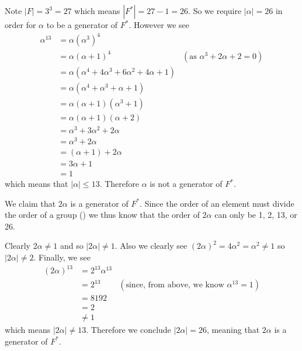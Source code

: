 \begin{questions}
\begin{partquestions}{\roman*}
        \item Note $|F| = 3^3 = 27$ which means $|F^\ast| = 27 - 1 = 26$. So we require $|\alpha| = 26$ in order for $\alpha$ to be a generator of $F^\ast$. However we see
        \begin{align*}
            \alpha^{13} &= \alpha(\alpha^3)^4\\
            &= \alpha(\alpha + 1)^4 & (\text{as }\alpha^3 + 2\alpha + 2 = 0)\\
            &= \alpha(\alpha^4 + 4\alpha^3 + 6\alpha^2 + 4\alpha + 1)\\
            &= \alpha(\alpha^4 + \alpha^3 + \alpha + 1)\\
            &= \alpha(\alpha+1)(\alpha^3+1)\\
            &= \alpha(\alpha+1)(\alpha+2)\\
            &= \alpha^3 + 3\alpha^2 + 2\alpha\\
            &= \alpha^3 + 2\alpha\\
            &= (\alpha + 1) + 2\alpha\\
            &= 3\alpha + 1\\
            &= 1
        \end{align*}
        which means that $|\alpha| \leq 13$. Therefore $\alpha$ is not a generator of $F^\ast$.

        \item We claim that $2\alpha$ is a generator of $F^\ast$. Since the order of an element must divide the order of a group () we thus know that the order of $2\alpha$ can only be 1, 2, 13, or 26.

        Clearly $2\alpha \neq 1$ and so $|2\alpha| \neq 1$. Also we clearly see $(2\alpha)^2 = 4\alpha^2 = \alpha^2 \neq 1$ so $|2\alpha| \neq 2$. Finally, we see
        \begin{align*}
            (2\alpha)^{13} &= 2^{13}\alpha^{13}\\
            &= 2^{13} & (\text{since, from above, we know }\alpha^{13} = 1)\\
            &= 8192\\
            &= 2\\
            &\neq 1
        \end{align*}
        which means $|2\alpha| \neq 13$. Therefore we conclude $|2\alpha| = 26$, meaning that $2\alpha$ is a generator of $F^\ast$.
    \end{partquestions}


\end{questions}
